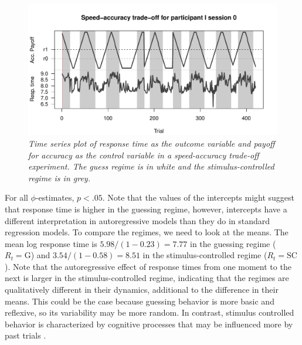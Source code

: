 \documentclass{article}
\begin{document}
\begin{figure}
\begin{center}
\includegraphics[scale=.5]{ts_plot_SAT}
\caption{\textit{Time series plot of response time as the outcome variable and payoff for accuracy as the control variable in a speed-accuracy trade-off experiment. The guess regime is in white and the stimulus-controlled regime is in grey.}}
\label{fig:ts_plot_SAT}
\end{center}
\end{figure}

For all $\phi$-estimates, $p < .05$.
Note that the values of the intercepts might suggest that response time is higher in the guessing regime, however, intercepts have a different interpretation in autoregressive models than they do in standard regression models.
To compare the regimes, we need to look at the means.
The mean log response time is $5.98/(1 - 0.23) = 7.77$ in the guessing regime ($R_t = \mathrm{G}$) and $3.54/(1 - 0.58) = 8.51$ in the stimulus-controlled regime ($R_t = \mathrm{SC}$). 
Note that the autoregressive effect of response times from one moment to the next is larger in the stimulus-controlled regime, indicating that the regimes are qualitatively different in their dynamics, additional to the difference in their means. This could be the case because guessing behavior is more basic and reflexive, so its variability may be more random. In contrast, stimulus controlled behavior is characterized by cognitive processes that may be influenced more by past trials \citep{RT_autocorrelation}.
\end{document}
